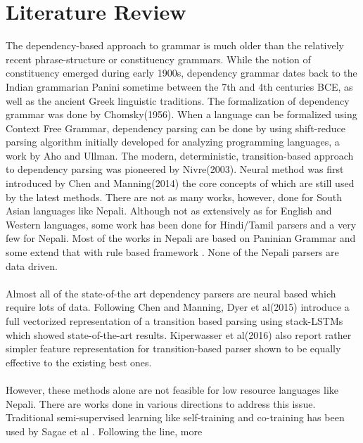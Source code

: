 \section {Literature Review}
The dependency-based approach to grammar is much older than the relatively
recent phrase-structure or constituency grammars. While the notion of
constituency emerged during early 1900s, dependency grammar dates back to the
Indian grammarian Panini sometime between the 7th and 4th centuries BCE, as
well as the ancient Greek linguistic traditions\cite{stanfordLec}. The
formalization of dependency grammar was done by Chomsky(1956)\cite{chomsky}.
When a language can be formalized using Context Free Grammar, dependency
parsing can be done by using shift-reduce parsing algorithm initially developed
for analyzing programming languages, a work by Aho and Ullman\cite{ullman}. The
modern, deterministic, transition-based approach to dependency parsing was
pioneered by Nivre(2003)\cite{nivre1}. Neural method was first introduced by
Chen and Manning(2014)\cite{chen} the core concepts of which are still used by
the latest methods.
\newline
\newline
There are not as many works, however, done for South Asian languages like
Nepali. Although not as extensively as for English and Western languages, some
work has been done for Hindi/Tamil parsers \cite{tamilDep} and a very few for
Nepali.  Most of the works in Nepali are based on Paninian Grammar
\cite{paninianEng,yajnik1,yajnik2} and some extend that with rule based
framework \cite{balCompGrammar}. None of the Nepali parsers are data driven.
\\~\\
Almost all of the state-of-the art dependency parsers are neural based which
require lots of data. Following Chen and Manning\cite{chen}, Dyer et
al(2015)\cite{stackLstm} introduce a full vectorized representation of a
transition based parsing using stack-LSTMs which showed state-of-the-art
results.  Kiperwasser et al(2016)\cite{bistParser} also report rather simpler
feature representation for transition-based parser shown to be equally
effective to the existing best ones.
\\~\\
However, these methods alone are not feasible for low resource languages like
Nepali. There are works done in various directions to address this issue.
Traditional semi-supervised learning like self-training and co-training has
been used by Sagae et al \cite{semiSupervised1}. Following the line, more
